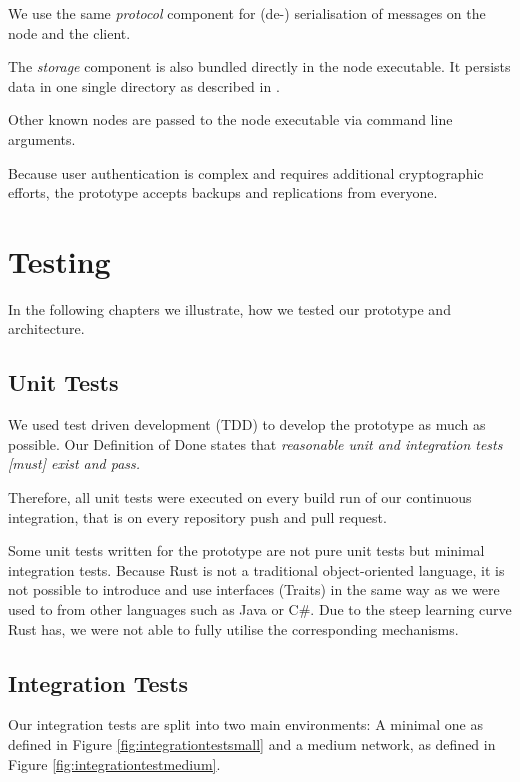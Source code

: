 We use the same \emph{protocol} component for (de-) serialisation of messages on the node and the client.

The \emph{storage} component is also bundled directly in the node executable. It persists data in one single directory as described in .

Other known nodes are passed to the node executable via command line arguments.

Because user authentication is complex and requires additional cryptographic efforts, the prototype accepts backups and replications from everyone.

\section{Testing}\label{testing}

In the following chapters we illustrate, how we tested our prototype and architecture.

\subsection{Unit Tests}\label{unit-tests}
We used test driven development (TDD) to develop the prototype as much as possible. Our Definition of Done\cite{project-plan} states that \emph{reasonable unit and integration tests [must] exist and pass.}

Therefore, all unit tests were executed on every build run of our continuous integration, that is on every repository push and pull request.

Some unit tests written for the prototype are not pure unit tests but minimal integration tests. Because Rust is not a traditional object-oriented language, it is not possible to introduce and use interfaces (Traits) in the same way as we were used to from other languages such as Java or C\#. Due to the steep learning curve Rust has, we were not able to fully utilise the corresponding mechanisms.

\subsection{Integration Tests}\label{integration-tests}

Our integration tests are split into two main environments: A minimal one as defined in Figure \ref{fig:integrationtestsmall} and a medium network, as defined in Figure \ref{fig:integrationtestmedium}.

